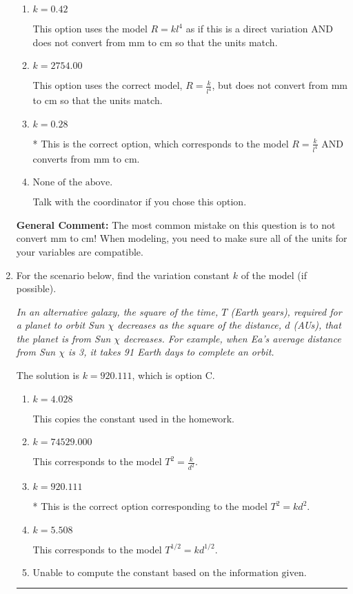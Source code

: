 \documentclass{extbook}[14pt]
\newcommand{\litem}[1]{\item #1

\rule{\textwidth}{0.4pt}}
\begin{document}
\begin{enumerate}
{\begin{enumerate}[label=\Alph*.]
This option uses the model $R = kl^{4}$ as if this is a direct variation.
\item \( k = 0.42 \)

This option uses the model $R = kl^{4}$ as if this is a direct variation AND does not convert from mm to cm so that the units match.
\item \( k = 2754.00 \)

This option uses the correct model, $R = \frac{k}{l^{4}}$, but does not convert from mm to cm so that the units match.
\item \( k = 0.28 \)

* This is the correct option, which corresponds to the model $R = \frac{k}{l^{4}}$ AND converts from mm to cm.
\item \( \text{None of the above.} \)

Talk with the coordinator if you chose this option.
\end{enumerate}

\textbf{General Comment:} The most common mistake on this question is to not convert mm to cm! When modeling, you need to make sure all of the units for your variables are compatible.
}
\litem{
For the scenario below, find the variation constant $k$ of the model (if possible).

\begin{center}
    \textit{ In an alternative galaxy, the square of the time, $T$ (Earth years), required for a planet to orbit Sun $\chi$ decreases as the square of the distance, $d$ (AUs), that the planet is from Sun $\chi$ decreases. For example, when Ea's average distance from Sun $\chi$ is 3, it takes 91 Earth days to complete an orbit. }
\end{center}
The solution is \( k = 920.111 \), which is option C.\begin{enumerate}[label=\Alph*.]
\item \( k = 4.028 \)

This copies the constant used in the homework.
\item \( k = 74529.000 \)

This corresponds to the model $T^{2} = \frac{k}{d^{2}}$.
\item \( k = 920.111 \)

* This is the correct option corresponding to the model $T^{2} = k d^{2}$.
\item \( k = 5.508 \)

This corresponds to the model $T^{1/2} = k d^{1/2}$.
\item \( \text{Unable to compute the constant based on the information given.} \)


\end{enumerate}}
\end{enumerate}
\end{document}
